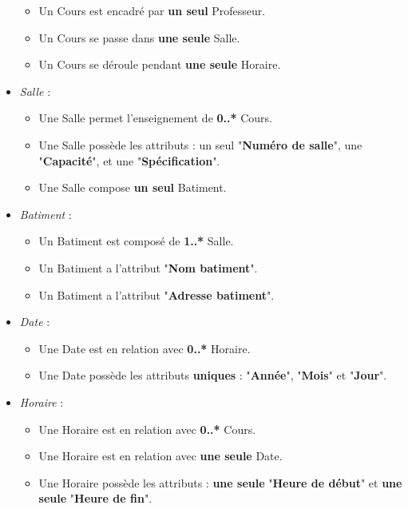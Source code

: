 \documentclass[a4paper, 11pt]{article}
\begin{document}
\begin{itemize}
\begin{itemize}
                \item Un Cours est encadré par \textbf{un seul} Professeur.
                \item Un Cours se passe dans \textbf{une seule} Salle.
                \item Un Cours se déroule pendant \textbf{une seule} Horaire.
                \end{itemize}
        \item \textit{Salle} :
                \begin{itemize}
                \item Une Salle permet l'enseignement de \textbf{0..*} Cours.
                \item Une Salle possède les attributs : un seul "\textbf{Numéro de salle}", une "\textbf{Capacité}", et une "\textbf{Spécification}".
                \item Une Salle compose \textbf{un seul} Batiment.
                \end{itemize}
        \item \textit{Batiment} :
                \begin{itemize}
                \item Un Batiment est composé de \textbf{1..*} Salle.
                \item Un Batiment a l'attribut "\textbf{Nom batiment}".
                \item Un Batiment a l'attribut "\textbf{Adresse batiment}".
                \end{itemize}
        \item \textit{Date} :
                \begin{itemize}
                \item Une Date est en relation avec \textbf{0..*} Horaire.
                \item Une Date possède les attributs \textbf{uniques} : "\textbf{Année}", "\textbf{Mois}" et "\textbf{Jour}".
                \end{itemize}
        \item \textit{Horaire} :
                \begin{itemize}
                \item Une Horaire est en relation avec \textbf{0..*} Cours.
                \item Une Horaire est en relation avec \textbf{une seule} Date.
                \item Une Horaire possède les attributs : \textbf{une seule} "\textbf{Heure de début}" et \textbf{une seule} "\textbf{Heure de fin}".
                \end{itemize}
        \end{itemize}
\end{document}
